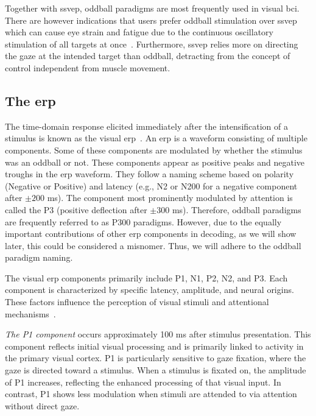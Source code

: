 Together with \ac{ssvep}, oddball paradigms are most frequently used in visual
\ac{bci}.
There are however indications that users prefer oddball stimulation over
\ac{ssvep} which can cause eye strain and fatigue due to the continuous
oscillatory stimulation of all targets at once~\cite{Xu2021}.
Furthermore, \ac{ssvep} relies more on directing the gaze at the intended
target than oddball, detracting from the concept of control independent from
muscle movement.



\subsection{The \acf{erp}}

The time-domain response elicited immediately after the intensification of a
stimulus is known as the visual \ac{erp}~\cite{Luck2014}.
An \ac{erp} is a waveform consisting of multiple components.
Some of these components are modulated by whether the stimulus was an
oddball or not.
These components appear as positive peaks and negative troughs in the \ac{erp}
waveform.
They follow a naming scheme based on polarity (Negative or Positive) and
latency (e.g., N2 or N200 for a negative component after $\pm200$ ms).
The component most prominently modulated by attention is called the P3
(positive deflection after $\pm300$ ms).
Therefore, oddball paradigms are frequently referred to as P300 paradigms.
However, due to the equally important contributions of other \ac{erp}
components in decoding, as we will show later, this could be considered a
misnomer.
Thus, we will adhere to the oddball paradigm naming.

The visual \ac{erp} components primarily include P1, N1, P2, N2, and P3.
Each component is characterized by specific latency, amplitude, and neural
origins.
These factors influence the perception of visual stimuli and attentional
mechanisms~\cite{Luck2013}.

\emph{The P1 component} occurs approximately 100 ms after stimulus presentation.
This component reflects initial visual processing and is primarily linked to
activity in the primary visual cortex.
P1 is particularly sensitive to gaze fixation, where the gaze is directed
toward a stimulus.
When a stimulus is fixated on, the amplitude of P1 increases, reflecting the
enhanced processing of that visual input.
In contrast, P1 shows less modulation when stimuli are attended to via
attention without direct gaze.

